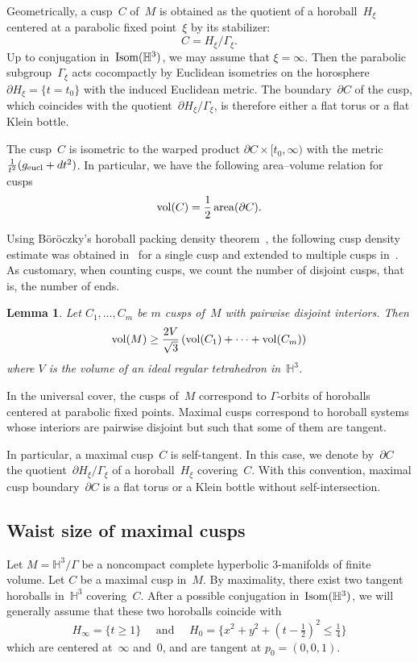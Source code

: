 \documentclass[11pt,reqno]{amsart}
\newtheorem{lemma}[theorem]{Lemma}
\theoremstyle{definition}
\numberwithin{equation}{section}
\newcommand{\HH}{{\mathbb H}}
\DeclareMathOperator{\area}{{\rm area}}
\DeclareMathOperator{\vol}{{\rm vol}}
\DeclareMathOperator{\Isom}{{\rm Isom}}
\numberwithin{equation}{section}
\begin{document}
Geometrically, a cusp~$C$ of~$M$ is obtained as the quotient of a horoball~$H_\xi$ centered at a parabolic fixed point~$\xi$ by its stabilizer:
\[
C=H_\xi/\Gamma_\xi.
\]
Up to conjugation in~$\Isom(\HH^3)$, we may assume that $\xi=\infty$.
Then the parabolic subgroup~$\Gamma_\xi$ acts cocompactly by Euclidean isometries on the horosphere $\partial H_\xi = \{ t = t_0 \}$ with the induced Euclidean metric.
The  boundary~$\partial C$ of the cusp, which coincides with the quotient~$\partial H_\xi / \Gamma_\xi$, is therefore either a flat torus or a flat Klein bottle.

The cusp~$C$ is isometric to the warped product $\partial C \times [t_0,\infty)$ with the metric $\frac{1}{t^2} (g_{\rm eucl} + dt^2)$.
In particular, we have the following area--volume relation for cusps
\begin{equation} \label{eq:AV}
\vol(C) = \frac{1}{2} \area(\partial C).
\end{equation}

Using B\"or\"oczky's horoball packing density theorem~\cite{boro}, the following cusp density estimate was obtained in~\cite{meyerhoff} for a single cusp and extended to multiple cusps in~\cite{adams_cusps}.
As customary, when counting cusps, we count the number of disjoint cusps, that is, the number of ends.

\begin{lemma} \label{lem:density}
Let $C_1,\dots,C_m$ be $m$ cusps of~$M$ with pairwise disjoint interiors.
Then
\begin{equation} \label{eq:density}
\vol(M) \geq \frac{2V}{\sqrt{3}} \left( \vol(C_1) + \cdots + \vol(C_m) \right)
\end{equation}
where $V$ is the volume of an ideal regular tetrahedron in~$\HH^3$.
\end{lemma}

In the universal cover, the cusps of~$M$ correspond to $\Gamma$-orbits of horoballs centered at parabolic fixed points.
Maximal cusps correspond to horoball systems whose interiors are pairwise disjoint but such that some of them are tangent.

In particular, a maximal cusp~$C$ is self-tangent.
In this case, we denote by~$\partial C$ the quotient~$\partial H_\xi/\Gamma_\xi$ of a horoball~$H_\xi$ covering~$C$.
With this convention, maximal cusp boundary~$\partial C$ is a flat torus or a Klein bottle without self-intersection.

\subsection{Waist size of maximal cusps}
Let $M=\HH^3/\Gamma$ be a noncompact complete hyperbolic $3$-manifolds of finite volume.
Let $C$ be a maximal cusp in~$M$.
By maximality, there exist two tangent horoballs in~$\HH^3$ covering~$C$.
After a possible conjugation in~$\Isom(\HH^3)$, we will generally assume that these two horoballs coincide with
\[
H_\infty=\{t \geq 1 \} \quad \mbox{ and } \quad H_0=\{x^2+y^2+(t-\tfrac{1}{2})^2 \leq \tfrac{1}{4} \}
\]
which are centered at~$\infty$ and~$0$, and are tangent at $p_0=(0,0,1)$.
\end{document}
